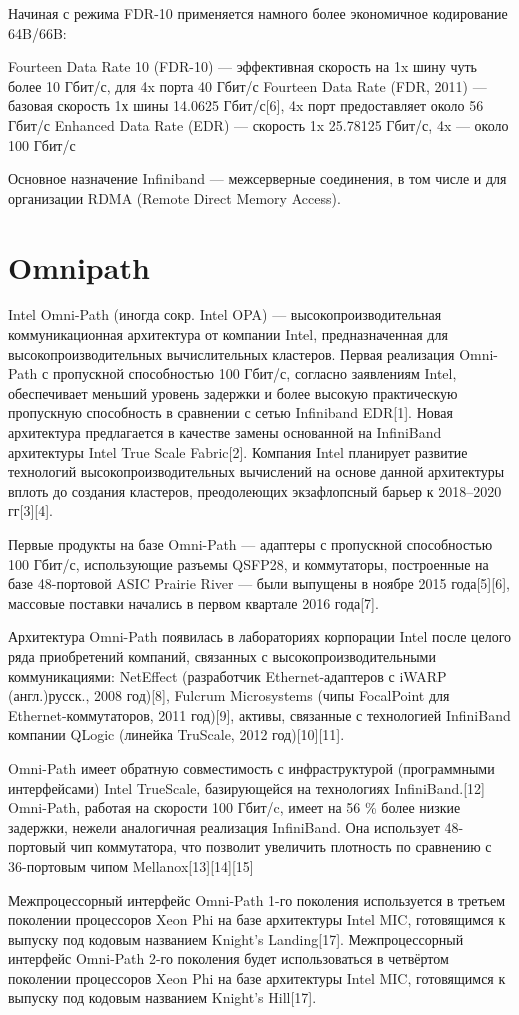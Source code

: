 Начиная с режима FDR-10 применяется намного более экономичное кодирование 64B/66B:

Fourteen Data Rate 10 (FDR-10) — эффективная скорость на 1x шину чуть более 10 Гбит/с, для 4x порта 40 Гбит/с
Fourteen Data Rate (FDR, 2011) — базовая скорость 1х шины 14.0625 Гбит/с[6], 4x порт предоставляет около 56 Гбит/с
Enhanced Data Rate (EDR) — скорость 1x 25.78125 Гбит/с, 4x — около 100 Гбит/с

Основное назначение Infiniband — межсерверные соединения, в том числе и для организации RDMA (Remote Direct Memory Access). 


\section{Omnipath}

Intel Omni-Path (иногда сокр. Intel OPA) — высокопроизводительная коммуникационная архитектура от компании Intel, предназначенная для высокопроизводительных вычислительных кластеров. Первая реализация Omni-Path с пропускной способностью 100 Гбит/с, согласно заявлениям Intel, обеспечивает меньший уровень задержки и более высокую практическую пропускную способность в сравнении с сетью Infiniband EDR[1]. Новая архитектура предлагается в качестве замены основанной на InfiniBand архитектуры Intel True Scale Fabric[2]. Компания Intel планирует развитие технологий высокопроизводительных вычислений на основе данной архитектуры вплоть до создания кластеров, преодолеющих экзафлопсный барьер к 2018–2020 гг[3][4].

Первые продукты на базе Omni-Path — адаптеры с пропускной способностью 100 Гбит/с, использующие разъемы QSFP28, и коммутаторы, построенные на базе 48-портовой ASIC Prairie River — были выпущены в ноябре 2015 года[5][6], массовые поставки начались в первом квартале 2016 года[7].

Архитектура Omni-Path появилась в лабораториях корпорации Intel после целого ряда приобретений компаний, связанных с высокопроизводительными коммуникациями: NetEffect (разработчик Ethernet-адаптеров с iWARP (англ.)русск., 2008 год)[8], Fulcrum Microsystems (чипы FocalPoint для Ethernet-коммутаторов, 2011 год)[9], активы, связанные с технологией InfiniBand компании QLogic (линейка TruScale, 2012 год)[10][11].

Omni-Path имеет обратную совместимость с инфраструктурой (программными интерфейсами) Intel TrueScale, базирующейся на технологиях InfiniBand.[12]
Omni-Path, работая на скорости 100 Гбит/c, имеет на 56 \% более низкие задержки, нежели аналогичная реализация InfiniBand. Она использует 48-портовый чип коммутатора, что позволит увеличить плотность по сравнению с 36-портовым чипом Mellanox[13][14][15]


    Межпроцессорный интерфейс Omni-Path 1-го поколения используется в третьем поколении процессоров Xeon Phi на базе архитектуры Intel MIC, готовящимся к выпуску под кодовым названием Knight’s Landing[17].
    Межпроцессорный интерфейс Omni-Path 2-го поколения будет использоваться в четвёртом поколении процессоров Xeon Phi на базе архитектуры Intel MIC, готовящимся к выпуску под кодовым названием Knight’s Hill[17].
    



